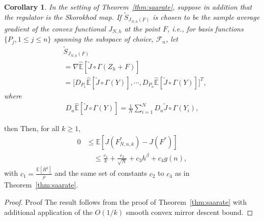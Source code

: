 \documentclass[11pt,leqno]{amsart}
\newtheorem{corollary}{Corollary}
\begin{document}
\begin{corollary}\label{cor:saarate}
In the setting of Theorem~\ref{thm:saarate}, suppose in addition that  the regulator is the Skorokhod map. If $\tilde{S}_{J_{N,h}(F)}$ is chosen to be the sample average gradient of the convex functional $J_{N,h}$ at the point $F$, i.e., for basis functions $\{P_j, 1\leq j\leq n\}$ spanning the subspace of choice, $\mathcal{F}_n$, let
\begin{align*}
&\tilde{S}_{J_{N,h}(F)}\\
&=\nabla \hat{\mathbb E}[\tilde{J}\circ\Gamma(Z_h + F)] \\
&=\Big[{D}_{P_1} \hat{\mathbb E}[\tilde{J}\circ\Gamma(Y)],\cdots,{D}_{P_n} \hat{\mathbb E}[\tilde{J}\circ\Gamma(Y)]\Big]^T,
\end{align*}
where
\begin{align*}
    {D}_u \hat{\mathbb E}[\tilde{J}\circ\Gamma(Y)] = \frac{1}{N}\sum_{i=1}^N D_u\tilde{J}\circ\Gamma(Y_i),
\end{align*}
\end{corollary}
then Then, for all $k \geq 1$,
\begin{equation}
\begin{aligned}
0 &\leq \mathbb{E}\left[ J(F^*_{N,n,k}) - J(F^*)\right]\\
&\quad\leq \frac{c_1}{k} + \frac{c_2}{\sqrt{N}} + c_3h^{\beta} + c_4 g(n),    
\end{aligned}
\end{equation}
with $c_1 = \frac{\mathbb{E}[R^2]}{\rho}$ and the same set of constants $c_2$ to $c_4$ as in Theorem~\ref{thm:saarate}.
\begin{proof}{Proof}
The result follows from the proof of Theorem~\ref{thm:saarate} with additional application of the $O(1/k)$ smooth convex mirror descent bound\citep[Theorem 4.4]{2015bub}.
 \end{proof}
\end{document}
